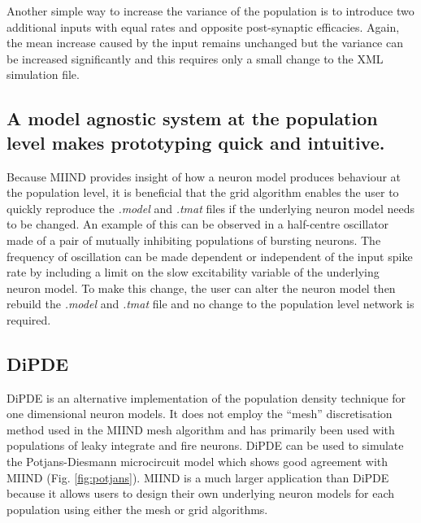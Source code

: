 \documentclass[utf8]{frontiersSCNS} %
\begin{document}
Another simple way to increase the variance of the population is to introduce two additional inputs with equal rates and opposite post-synaptic efficacies. Again, the mean increase caused by the input remains unchanged but the variance can be increased significantly and this requires only a small change to the XML simulation file.\\

\subsection*{A model agnostic system at the population level makes prototyping quick and intuitive.}
Because MIIND provides insight of how a neuron model produces behaviour at the population level, it is beneficial that the grid algorithm enables the user to quickly reproduce the \textit{.model} and \textit{.tmat} files if the underlying neuron model needs to be changed. An example of this can be observed in a half-centre oscillator made of a pair of mutually inhibiting populations of bursting neurons. The frequency of oscillation can be made dependent or independent of the input spike rate by including a limit on the slow excitability variable of the underlying neuron model. To make this change, the user can alter the neuron model then rebuild the \textit{.model} and \textit{.tmat} file and no change to the population level network is required.\\

\subsection*{DiPDE}
DiPDE \citep{dipdewebsite,iyer2013influence} is an alternative implementation of the population density technique for one dimensional neuron models. It does not employ the ``mesh'' discretisation method used in the MIIND mesh algorithm and has primarily been used with populations of leaky integrate and fire neurons. DiPDE can be used to simulate the Potjans-Diesmann microcircuit model \citep{cain2016computational} which shows good agreement with MIIND (Fig. \ref{fig:potjans}). MIIND is a much larger application than DiPDE because it allows users to design their own underlying neuron models for each population using either the mesh or grid algorithms. \\
\end{document}
